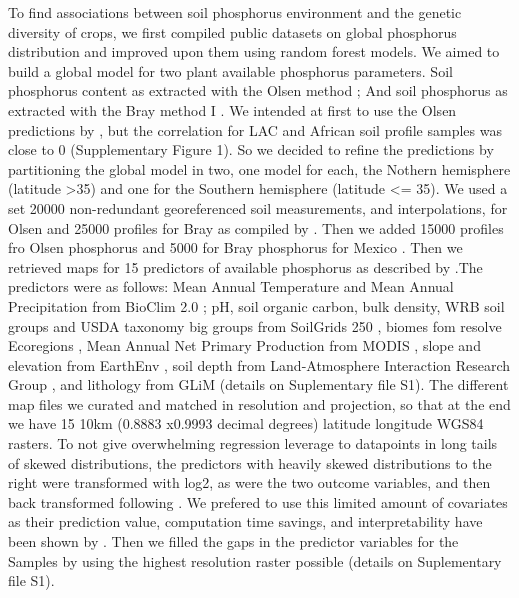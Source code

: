 To find associations between soil phosphorus environment and the genetic diversity of crops, we first compiled public datasets on global phosphorus distribution and improved upon them using random forest models.
We aimed to  build a global model for two plant available phosphorus parameters. Soil phosphorus content as extracted with the Olsen method \citep{olsen1954}; And soil phosphorus as extracted with the Bray method I \citep{bray1945}.
We intended at first to use the Olsen predictions by \citep{mcdowell2023}, but the correlation for LAC and African soil profile samples was close to 0 (Supplementary Figure 1). So we decided to refine the predictions by partitioning the global model in two, one model for each, the Nothern hemisphere (latitude >35) and one for the Southern hemisphere (latitude <= 35).
We used a set 20000 non-redundant georeferenced soil measurements, and interpolations,  for Olsen and  25000 profiles for Bray as compiled by \citep{mcdowell2023}. Then we added 15000 profiles fro Olsen phosphorus and 5000 for Bray phosphorus for Mexico \citep{paz-pellat2018}.
Then we retrieved maps for 15 predictors of available phosphorus as described by \citep{hexianjin2022}.The predictors were as follows: Mean Annual Temperature and Mean Annual Precipitation from BioClim 2.0 \citep{fick2017}; pH, soil organic carbon, bulk density, WRB soil groups and  USDA taxonomy big groups from SoilGrids 250 \citep{hengl2019,hengl2017,wrb2022,scheffe2015}, biomes fom resolve Ecoregions \citep{dinerstein2017}, Mean Annual Net Primary Production from MODIS \citep{running2015a}, slope and elevation from EarthEnv \citep{amatulli2018}, soil depth  from Land-Atmosphere Interaction Research Group \citep{shangguan2017}, and lithology from GLiM \citep{hartmann2012}(details on Suplementary file S1).
The different map files we curated and matched in resolution and projection, so that at the end we have 15 10km (0.8883 x0.9993 decimal degrees) latitude longitude WGS84 rasters. To not give  overwhelming regression leverage to datapoints in long tails of skewed distributions, the predictors with heavily skewed distributions to the right were transformed  with log2, as were the two outcome variables, and then back transformed following \citep{mcdowell2023}.
We prefered to use this limited amount of covariates as their prediction value, computation time savings, and interpretability have been shown by \citep{hexianjin2022}. 
Then we filled the gaps in the predictor variables for the \cite{mcdowell2023} Samples by using the highest resolution raster possible (details on Suplementary file S1).
